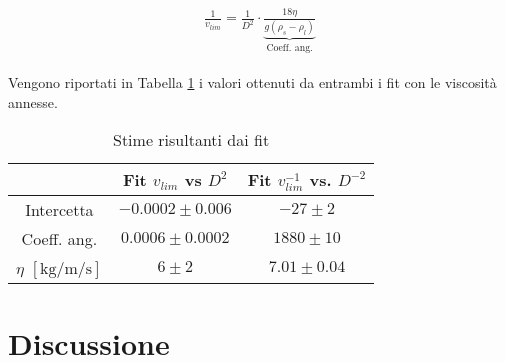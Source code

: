\documentclass[a4paper,11pt,oneside]{article}
\begin{document}
\begin{align*}
\begin{split}
     \frac{1}{v_{lim}}= \frac{1}{D^{2}} \cdot \underbrace{\frac{18 \eta}{g (\rho_s - \rho_l)}}_\text{Coeff. ang.}
\end{split}
\end{align*}


\begin{figure}[h!]
    \centering
    \caption*{}
\end{figure}

\begin{figure}
    \centering
    
\end{figure}

Vengono riportati in Tabella \ref{tab:fit} i valori ottenuti da entrambi i fit con le viscosità annesse.

\begin{table}[h!] %
\centering
    \begin{tabular}{|c|c|c|} \hline
        & Fit $v_{lim}$ vs $D^{2}$ & Fit $v_{lim}^{-1}$ vs. $D^{-2}$ \\ \hline
        \rowcolor[rgb]{0.85,0.85,0.85}Intercetta & $-0.0002 \pm 0.006$ & $-27 \pm 2$ \\ \hline
        Coeff. ang. & $0.0006 \pm 0.0002$ & $1880 \pm 10$ \\ \hline
        \rowcolor[rgb]{0.85,0.85,0.85}$\eta$ $[\si{\kilo\gram\per\metre\per\second}]$ & $6 \pm 2$ & $7.01 \pm 0.04$ \\ \hline
    \end{tabular}
\caption{Stime risultanti dai fit}
\label{tab:fit}
\end{table}


\section{Discussione}
\end{document}
